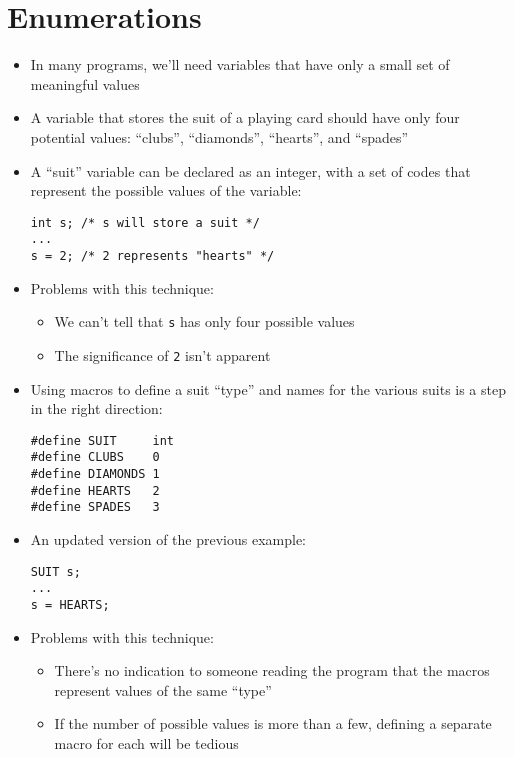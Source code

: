 \documentclass{article}
\begin{document}
\section{Enumerations}
\begin{itemize}
\item In many programs, we'll need variables that have only a small set of meaningful values

\item A variable that stores the suit of a playing card should have only four potential values: ``clubs'', ``diamonds'', ``hearts'', and ``spades''

\item A ``suit'' variable can be declared as an integer, with a set of codes that represent the possible values of the variable:
\begin{verbatim}
int s; /* s will store a suit */
...
s = 2; /* 2 represents "hearts" */
\end{verbatim}

\item Problems with this technique:
\begin{itemize}
\item We can't tell that \verb!s! has only four possible values
\item The significance of \verb!2! isn't apparent
\end{itemize}

\item Using macros to define a suit ``type'' and names for the various suits is a step in the right direction:
\begin{verbatim}
#define SUIT     int
#define CLUBS    0
#define DIAMONDS 1
#define HEARTS   2
#define SPADES   3
\end{verbatim}

\item An updated version of the previous example:
\begin{verbatim}
SUIT s;
...
s = HEARTS;
\end{verbatim}

\item Problems with this technique:
\begin{itemize}
\item There's no indication to someone reading the program that the macros represent values of the same ``type''

\item If the number of possible values is more than a few, defining a separate macro for each will be tedious


\end{itemize}
\end{itemize}
\end{document}
